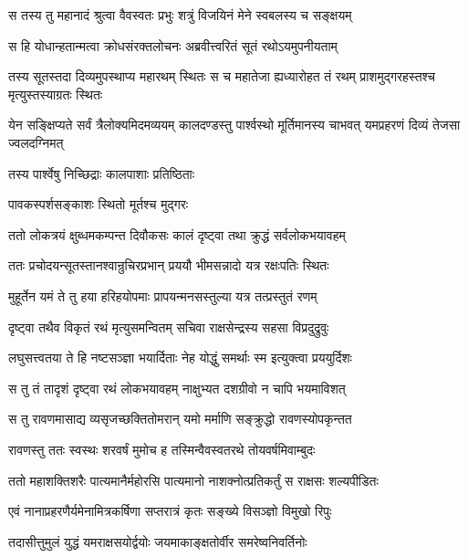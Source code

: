 
\twolineshloka
{स तस्य तु महानादं श्रुत्वा वैवस्वतः प्रभुः}
{शत्रुं विजयिनं मेने स्वबलस्य च सङ्क्षयम्} %

\twolineshloka
{स हि योधान्हतान्मत्वा क्रोधसंरक्तलोचनः}
{अब्रवीत्त्वरितं सूतं रथोऽयमुपनीयताम्} %

\threelineshloka
{तस्य सूतस्तदा दिव्यमुपस्थाप्य महारथम्}
{स्थितः स च महातेजा ह्यध्यारोहत तं रथम्}
{प्राशमुद्गरहस्तश्च मृत्युस्तस्याग्रतः स्थितः} %

\threelineshloka
{येन सङ्क्षिप्यते सर्वं त्रैलोक्यमिदमव्ययम्}
{कालदण्डस्तु पार्श्वस्थो मूर्तिमानस्य चाभवत्}
{यमप्रहरणं दिव्यं तेजसा ज्वलदग्निमत्} %

\onelineshloka
{तस्य पार्श्वेषु निच्छिद्राः कालपाशाः प्रतिष्ठिताः} %

\onelineshloka
{पावकस्पर्शसङ्काशः स्थितो मूर्तश्च मुद्गरः} %

\twolineshloka
{ततो लोकत्रयं क्षुब्धमकम्पन्त दिवौकसः}
{कालं दृष्ट्वा तथा क्रुद्धं सर्वलोकभयावहम्} %

\twolineshloka
{ततः प्रचोदयन्सूतस्तानश्वान्रुचिरप्रभान्}
{प्रययौ भीमसन्नादो यत्र रक्षःपतिः स्थितः} %

\twolineshloka
{मुहूर्तेन यमं ते तु हया हरिहयोपमाः}
{प्रापयन्मनसस्तुल्या यत्र तत्प्रस्तुतं रणम्} %

\twolineshloka
{दृष्ट्वा तथैव विकृतं रथं मृत्युसमन्वितम्}
{सचिवा राक्षसेन्द्रस्य सहसा विप्रदुद्रुवुः} %

\twolineshloka
{लघुसत्त्वतया ते हि नष्टसञ्ज्ञा भयार्दिताः}
{नेह योद्धुं समर्थाः स्म इत्युक्त्वा प्रययुर्दिशः} %

\twolineshloka
{स तु तं तादृशं दृष्ट्वा रथं लोकभयावहम्}
{नाक्षुभ्यत दशग्रीवो न चापि भयमाविशत्} %

\twolineshloka
{स तु रावणमासाद्य व्यसृजच्छक्तितोमरान्}
{यमो मर्माणि सङ्क्रुद्धो रावणस्योपकृन्तत} %

\twolineshloka
{रावणस्तु ततः स्वस्थः शरवर्षं मुमोच ह}
{तस्मिन्वैवस्वतरथे तोयवर्षमिवाम्बुदः} %

\twolineshloka
{ततो महाशक्तिशरैः पात्यमानैर्महोरसि पात्यमानो}
{नाशक्नोत्प्रतिकर्तुं स राक्षसः शल्यपीडितः} %

\twolineshloka
{एवं नानाप्रहरणैर्यमेनामित्रकर्षिणा}
{सप्तरात्रं कृतः सङ्ख्ये विसञ्ज्ञो विमुखो रिपुः} %

\twolineshloka
{तदासीत्तुमुलं युद्धं यमराक्षसयोर्द्वयोः}
{जयमाकाङ्क्षतोर्वीर समरेष्वनिवर्तिनोः} %

